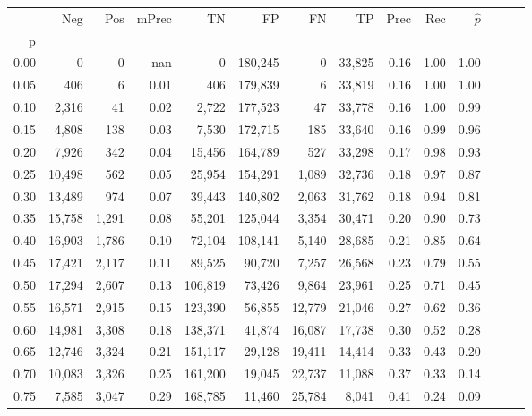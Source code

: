 \begin{tabular}{rrrrrrrrrrrrrr}
\toprule
{} &     Neg &    Pos & mPrec &       TN &       FP &      FN &      TP &  Prec &   Rec & $\hat{p}$ \\
p    &         &        &       &          &          &         &         &       &       &           \\
\midrule
0.00 &       0 &      0 &   nan &        0 &  180,245 &       0 &  33,825 &  0.16 &  1.00 &      1.00 \\
0.05 &     406 &      6 &  0.01 &      406 &  179,839 &       6 &  33,819 &  0.16 &  1.00 &      1.00 \\
0.10 &   2,316 &     41 &  0.02 &    2,722 &  177,523 &      47 &  33,778 &  0.16 &  1.00 &      0.99 \\
0.15 &   4,808 &    138 &  0.03 &    7,530 &  172,715 &     185 &  33,640 &  0.16 &  0.99 &      0.96 \\
0.20 &   7,926 &    342 &  0.04 &   15,456 &  164,789 &     527 &  33,298 &  0.17 &  0.98 &      0.93 \\
0.25 &  10,498 &    562 &  0.05 &   25,954 &  154,291 &   1,089 &  32,736 &  0.18 &  0.97 &      0.87 \\
0.30 &  13,489 &    974 &  0.07 &   39,443 &  140,802 &   2,063 &  31,762 &  0.18 &  0.94 &      0.81 \\
0.35 &  15,758 &  1,291 &  0.08 &   55,201 &  125,044 &   3,354 &  30,471 &  0.20 &  0.90 &      0.73 \\
0.40 &  16,903 &  1,786 &  0.10 &   72,104 &  108,141 &   5,140 &  28,685 &  0.21 &  0.85 &      0.64 \\
0.45 &  17,421 &  2,117 &  0.11 &   89,525 &   90,720 &   7,257 &  26,568 &  0.23 &  0.79 &      0.55 \\
0.50 &  17,294 &  2,607 &  0.13 &  106,819 &   73,426 &   9,864 &  23,961 &  0.25 &  0.71 &      0.45 \\
0.55 &  16,571 &  2,915 &  0.15 &  123,390 &   56,855 &  12,779 &  21,046 &  0.27 &  0.62 &      0.36 \\
0.60 &  14,981 &  3,308 &  0.18 &  138,371 &   41,874 &  16,087 &  17,738 &  0.30 &  0.52 &      0.28 \\
0.65 &  12,746 &  3,324 &  0.21 &  151,117 &   29,128 &  19,411 &  14,414 &  0.33 &  0.43 &      0.20 \\
0.70 &  10,083 &  3,326 &  0.25 &  161,200 &   19,045 &  22,737 &  11,088 &  0.37 &  0.33 &      0.14 \\
0.75 &   7,585 &  3,047 &  0.29 &  168,785 &   11,460 &  25,784 &   8,041 &  0.41 &  0.24 &      0.09 \\

\end{tabular}
